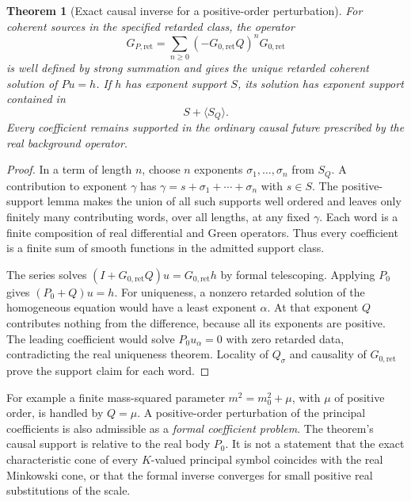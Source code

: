 \documentclass[11pt,letterpaper]{article}
\newtheorem{theorem}{Theorem}[section]
\theoremstyle{definition}
\theoremstyle{remark}
\begin{document}
\begin{theorem}[Exact causal inverse for a positive-order perturbation]\label{vtf:mink:thm:retardedperturb}
For coherent sources in the specified retarded class, the operator
\begin{equation}\label{vtf:mink:eq:NeumannGreen}
 G_{P,\mathrm{ret}}
 =\sum_{n\geq0}(-G_{0,\mathrm{ret}}Q)^nG_{0,\mathrm{ret}}
\end{equation}
is well defined by strong summation and gives the unique retarded coherent solution of $Pu=h$. If $h$ has exponent support $S$, its solution has exponent support contained in
\begin{equation}
 S+\langle S_Q\rangle.
\end{equation}
Every coefficient remains supported in the ordinary causal future prescribed by the real background operator.
\end{theorem}
\begin{proof}
In a term of length $n$, choose $n$ exponents $\sigma_1,\ldots,\sigma_n$ from $S_Q$. A contribution to
exponent $\gamma$ has $\gamma=s+\sigma_1+\cdots+\sigma_n$ with $s\in S$. The positive-support lemma makes the union of all such supports well ordered and leaves only finitely many contributing words, over all lengths, at any fixed $\gamma$. Each word is a finite composition of real differential and Green operators. Thus every coefficient is a finite sum of smooth functions in the admitted support class.

The series solves $(I+G_{0,\mathrm{ret}}Q)u=G_{0,\mathrm{ret}}h$ by formal telescoping. Applying $P_0$ gives $(P_0+Q)u=h$. For uniqueness, a nonzero retarded solution of the homogeneous equation would have a least exponent $\alpha$. At that exponent $Q$ contributes nothing from the difference, because all its exponents are positive. The leading coefficient would solve $P_0u_\alpha=0$ with zero retarded data, contradicting the real uniqueness theorem. Locality of $Q_\sigma$ and causality of $G_{0,\mathrm{ret}}$ prove the support claim for each word.
\end{proof}

For example a finite mass-squared parameter $m^2=m_0^2+\mu$, with $\mu$ of positive order, is handled by $Q=\mu$. A positive-order perturbation of the principal coefficients is also admissible as a \emph{formal coefficient problem}. The theorem's causal support is relative to the real body $P_0$. It is not a statement that the exact characteristic cone of every $K$-valued principal symbol coincides with the real Minkowski cone, or that the formal inverse converges for small positive real substitutions of the scale.
\end{document}

